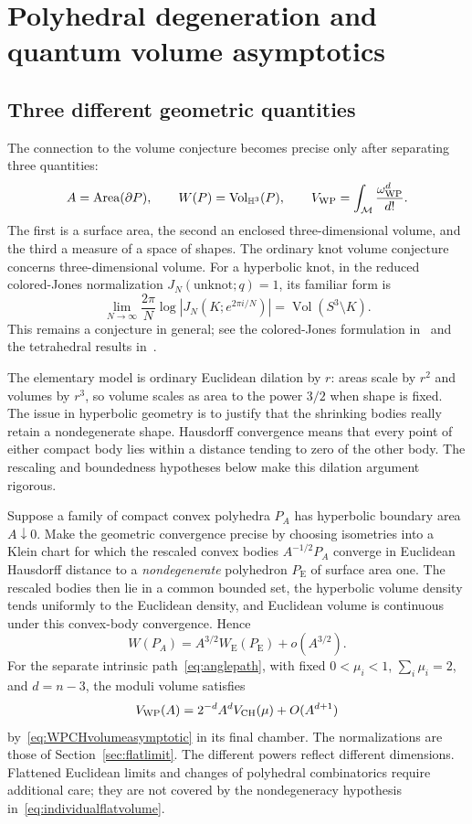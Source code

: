 \section{Polyhedral degeneration and quantum volume asymptotics}
\label{sec:quantumdegeneration}

\subsection{Three different geometric quantities}

The connection to the volume conjecture becomes precise only after
separating three quantities:
\[
 A=\operatorname{Area}(\partial P),\qquad
 W(P)=\operatorname{Vol}_{\mathbb H^3}(P),\qquad
 V_{\mathrm{WP}}=\int_{\mathcal M}\frac{\omega_{\mathrm{WP}}^d}{d!}.
\]
The first is a surface area, the second an enclosed three-dimensional
volume, and the third a measure of a space of shapes. The ordinary
knot volume conjecture concerns three-dimensional volume. For a
hyperbolic knot, in the reduced colored-Jones normalization
$J_N(\text{unknot};q)=1$, its familiar form is
\begin{equation}
 \lim_{N\to\infty}\frac{2\pi}{N}
 \log\left|J_N(K;e^{2\pi i/N})\right|
 =\operatorname{Vol}(S^3\setminus K).
 \label{eq:volumeconjecture}
\end{equation}
This remains a conjecture in general; see the colored-Jones
formulation in~\cite{MurakamiMurakami} and the tetrahedral
results in~\cite{Costantino}.

The elementary model is ordinary Euclidean dilation by $r$: areas
scale by $r^2$ and volumes by $r^3$, so volume scales as area to
the power $3/2$ when shape is fixed. The issue in hyperbolic
geometry is to justify that the shrinking bodies really retain
a nondegenerate shape. Hausdorff convergence means that every point
of either compact body lies within a distance tending to zero of
the other body. The rescaling and boundedness hypotheses below
make this dilation argument rigorous.

Suppose a family of compact convex polyhedra $P_A$ has hyperbolic
boundary area $A\downarrow0$. Make the geometric convergence
precise by choosing isometries into a Klein chart for which the
rescaled convex bodies $A^{-1/2}P_A$ converge in Euclidean
Hausdorff distance to a \emph{nondegenerate} polyhedron
$P_{\mathrm E}$ of surface area one. The rescaled bodies then lie
in a common bounded set, the hyperbolic volume density tends
uniformly to the Euclidean density, and Euclidean volume is
continuous under this convex-body convergence. Hence
\begin{equation}
 W(P_A)=A^{3/2}W_{\mathrm E}(P_{\mathrm E})+o(A^{3/2}).
 \label{eq:individualflatvolume}
\end{equation}
For the separate intrinsic path~\eqref{eq:anglepath}, with fixed
$0<\mu_i<1$, $\sum_i\mu_i=2$, and $d=n-3$, the moduli volume
satisfies
\[
 V_{\mathrm{WP}}(A)=2^{-d}A^d V_{\mathrm{CH}}(\mu)+O(A^{d+1})
\]
by~\eqref{eq:WPCHvolumeasymptotic} in its final chamber. The
normalizations are those of Section~\ref{sec:flatlimit}.
The different powers reflect different dimensions. Flattened
Euclidean limits and changes of polyhedral combinatorics require
additional care; they are not covered by the nondegeneracy
hypothesis in~\eqref{eq:individualflatvolume}.


